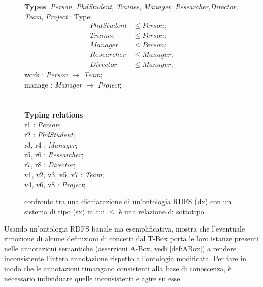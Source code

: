 \begin{figure}
\begin{minipage}[t]{0.45\textwidth}
			\textbf{Types}: \textit{Person}, \textit{PhdStudent}, \textit{Trainee}, \textit{Manager}, \textit{Researcher},\textit{Director}, \textit{Team}, \textit{Project} : Type;
			\begin{align}
			PhdStudent &\le Person;\\
			Trainee &\le Person;\\
			Manager &\le Person;\\
			Researcher &\le Manager;\\
			Director &\le Manager;
		\end{align}
			work : \textit{Person} $\to$ \textit{Team};\\
			manage : \textit{Manager} $\to$ \textit{Project};\\\\\\
			\textbf{Typing relations}\\
			r1 : \textit{Person};\\
			r2 : \textit{PhdStudent};\\
			r3, r4 : \textit{Manager};\\
			r5, r6 : \textit{Researcher};\\
			r7, r8 : \textit{Director};\\
			v1, v2, v3, v5, v7 : \textit{Team};\\
			v4, v6, v8 : \textit{Project};\\
	\end{minipage}
	\captionsetup{justification=Centering}
	\caption{confronto tra una dichiarazione di un'ontologia RDFS (dx) con un sistema di tipo (sx) in cui $\le$ è una relazione di sottotipo}
	\label{fig:confrontotypesystem}
\end{figure}
\noindent
Usando un'ontologia RDFS banale ma esemplificativa, \cite{despeyroux2008evolution} mostra che l'eventuale rimozione di  alcune definizioni di concetti dal T-Box porta le loro istanze presenti nelle annotazioni semantiche (asserzioni A-Box, vedi \autoref{def:ABox}) a rendere inconsistente l'intera annotazione rispetto all'ontologia modificata. Per fare in modo che le annotazioni rimangano consistenti alla base di conoscenza, è necessario individuare quelle inconsistenti e agire su esse.
